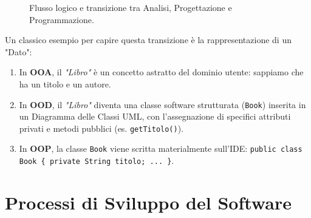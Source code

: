 \documentclass[10pt, a4paper]{article}
\begin{document}
\begin{figure}[h]
    \centering
    \vspace{0.3cm}
    \caption{Flusso logico e transizione tra Analisi, Progettazione e Programmazione.}
    \label{fig:ooa_ood_oop}
\end{figure}

Un classico esempio per capire questa transizione è la rappresentazione di un "Dato":
\begin{enumerate}
    \item In \textbf{OOA}, il \textit{"Libro"} è un concetto astratto del dominio utente: sappiamo che ha un titolo e un autore.
    \item In \textbf{OOD}, il \textit{"Libro"} diventa una classe software strutturata (\texttt{Book}) inserita in un Diagramma delle Classi UML, con l'assegnazione di specifici attributi privati e metodi pubblici (es. \texttt{getTitolo()}).
    \item In \textbf{OOP}, la classe \texttt{Book} viene scritta materialmente sull'IDE: \texttt{public class Book \{ private String titolo; ... \}}.
\end{enumerate}

\section{Processi di Sviluppo del Software}
\end{document}
